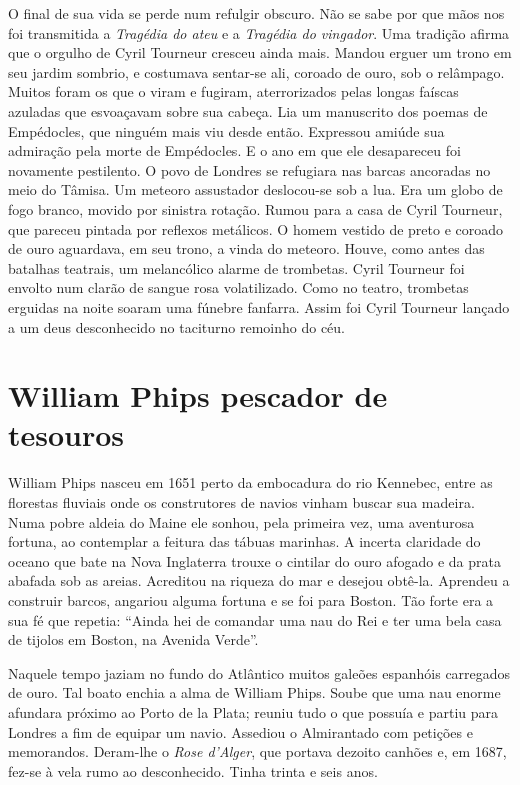 O final de sua vida se perde num refulgir obscuro. Não se sabe por que mãos
nos foi transmitida a \textit{Tragédia do ateu} e a \textit{Tragédia do
vingador}. Uma tradição afirma que o orgulho de Cyril Tourneur cresceu
ainda mais. Mandou erguer um trono em seu jardim sombrio, e costumava
sentar-se ali, coroado de ouro, sob o relâmpago. Muitos foram os que o
viram e fugiram, aterrorizados pelas longas faíscas azuladas que
esvoaçavam sobre sua cabeça. Lia um manuscrito dos poemas de Empédocles,
que ninguém mais viu desde então. Expressou amiúde sua admiração pela
morte de Empédocles. E o ano em que ele desapareceu foi novamente
pestilento. O povo de Londres se refugiara nas barcas ancoradas no meio do
Tâmisa. Um meteoro assustador deslocou-se sob a lua. Era um globo de fogo
branco, movido por sinistra rotação. Rumou para a casa de Cyril Tourneur,
que pareceu pintada por reflexos metálicos. O homem vestido de preto e
coroado de ouro aguardava, em seu trono, a vinda do meteoro. Houve, como
antes das batalhas teatrais, um melancólico alarme de trombetas. Cyril
Tourneur foi envolto num clarão de sangue rosa volatilizado. Como no
teatro, trombetas erguidas na noite soaram uma fúnebre fanfarra. Assim foi
Cyril Tourneur lançado a um deus desconhecido no taciturno remoinho do
céu.

\chapter{William Phips pescador de tesouros}

William Phips nasceu em 1651 perto da embocadura do rio Kennebec, entre as
florestas fluviais onde os construtores de navios vinham buscar sua
madeira. Numa pobre aldeia do Maine ele sonhou, pela primeira vez, uma
aventurosa fortuna, ao contemplar a feitura das tábuas marinhas. A incerta
claridade do oceano que bate na Nova Inglaterra trouxe o cintilar do ouro
afogado e da prata abafada sob as areias. Acreditou na riqueza do mar e
desejou obtê-la. Aprendeu a construir barcos, angariou alguma fortuna e se
foi para Boston. Tão forte era a sua fé que repetia: “Ainda hei de
comandar uma nau do Rei e ter uma bela casa de tijolos em Boston, na
Avenida Verde”.

Naquele tempo jaziam no fundo do Atlântico muitos galeões espanhóis
carregados de ouro. Tal boato enchia a alma de William Phips. Soube que
uma nau enorme afundara próximo ao Porto de la Plata; reuniu tudo o que
possuía e partiu para Londres a fim de equipar um navio. Assediou o
Almirantado com petições e memorandos. Deram-lhe o \textit{Rose d’Alger},
que portava dezoito canhões e, em 1687, fez-se à vela rumo ao
desconhecido. Tinha trinta e seis anos.

